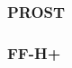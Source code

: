 \documentclass[runningheads,a4paper]{llncs}
\begin{document}
\subsubsection{PROST}

\subsubsection{FF-H+}

%


\end{document}
